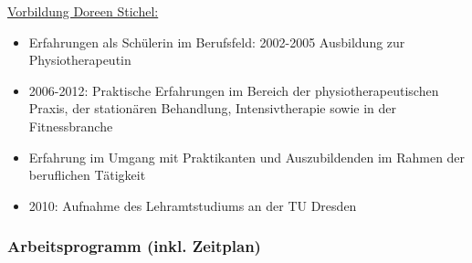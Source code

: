 \underline{Vorbildung Doreen Stichel:}\\
\begin{itemize}
	\item Erfahrungen als Schülerin im Berufsfeld: 2002-2005 Ausbildung zur Physiotherapeutin
	\item 2006-2012: Praktische Erfahrungen im Bereich der physiotherapeutischen Praxis, der stationären Behandlung, Intensivtherapie sowie in der Fitnessbranche
	\item Erfahrung im Umgang mit Praktikanten und Auszubildenden im Rahmen der beruflichen Tätigkeit
	\item 2010: Aufnahme des Lehramtstudiums an der TU Dresden
\end{itemize}

\newpage

\subsubsection{Arbeitsprogramm (inkl. Zeitplan)}
\label{sec:ArbeitsprogrammInklZeitplan}


